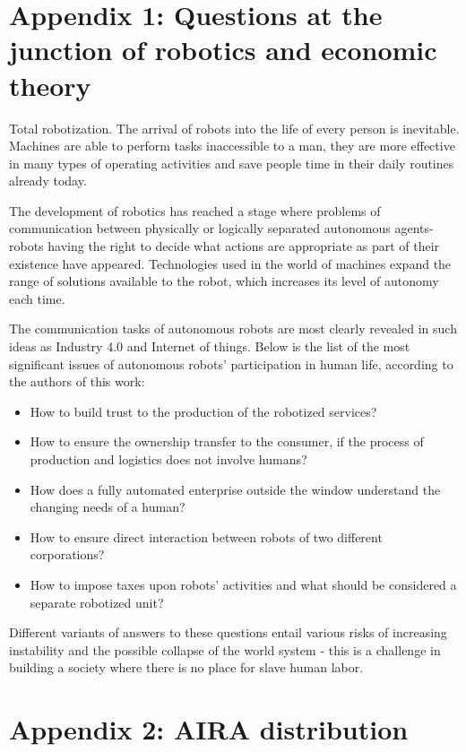 \documentclass{article}
\begin{document}
\section*{Appendix 1: Questions at the junction of robotics and economic theory}

Total robotization. The arrival of robots into the life of every person is inevitable. Machines are able to perform tasks inaccessible to a man, they are more effective in many types of operating activities and save people time in their daily routines already today.

The development of robotics has reached a stage where problems of communication between physically or logically separated autonomous agents-robots having the right to decide what actions are appropriate as part of their existence have appeared. Technologies used in the world of machines expand the range of solutions available to the robot, which increases its level of autonomy each time.   

The communication tasks of autonomous robots are most clearly revealed in such ideas as Industry 4.0 and Internet of things. Below is the list of the most significant issues of autonomous robots' participation in human life, according to the authors of this work:

\begin{itemize}
	\item How to build trust to the production of the robotized services?
	\item How to ensure the ownership transfer to the consumer, if the process of production and logistics does not involve humans?  
	\item How does a fully automated enterprise outside the window understand the changing needs of a human?
	\item How to ensure direct interaction between robots of two different corporations?
	\item How to impose taxes upon robots' activities and what should be considered a separate robotized unit?
\end{itemize}

Different variants of answers to these questions entail various risks of increasing instability and the possible collapse of the world system - this is a challenge in building a society where there is no place for slave human labor.

\section*{Appendix 2: AIRA distribution}
\end{document}
